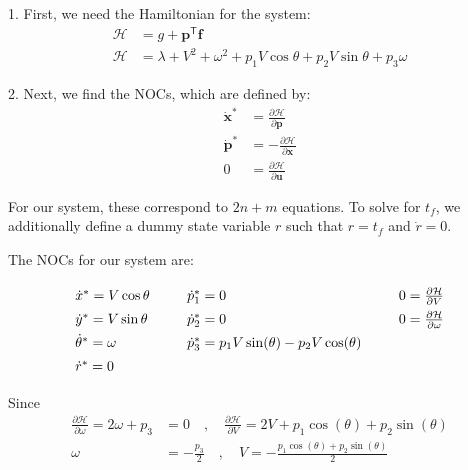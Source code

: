 \documentclass{article}
\begin{document}
\begin{enumerate}[label=(\roman*)]
	1. First, we need the Hamiltonian for the system:
	\begin{equation}
	\begin{aligned}
	\mathcal{H} &= g + \bm p^\mathsf{T} \bm f \\
	\mathcal{H} &= \lambda + V^2 + \omega^2 +
	               p_1 V\cos\theta + p_2 V\sin\theta + p_3 \omega
	\end{aligned}
	\end{equation}
	
	2. Next, we find the NOCs, which are defined by:
	\begin{equation}
	\begin{aligned}
	\dot{\bm{x}}^* &= \frac{\partial \mathcal{H}}{\partial \bm{p}} \\
	\dot{\bm{p}}^* &= -\frac{\partial \mathcal{H}}{\partial \bm{x}} \\
	0 &= \frac{\partial \mathcal{H}}{\partial \bm{u}}
	\end{aligned}
	\end{equation}
	
	For our system, these correspond to $2n+m$ equations. To solve for $t_f$, we additionally define a dummy state variable $r$ such that $r=t_f$ and $\dot r=0$.
	
	The NOCs for our system are:
	
	\begin{equation}
	{\renewcommand{\arraystretch}{1.4}
	\begin{tabular}[c]{l l l l l}
	$\dot x^* = V \cos\theta$ &\;&
	$\dot p_1^* = 0$	&\;&
	$0 = \frac{\partial\mathcal{H}}{\partial V}$ \\
	
	$\dot y^* = V \sin\theta$ &\;&
	$\dot p_2^* = 0$	&\;&
	$0 = \frac{\partial\mathcal{H}}{\partial \omega}$ \\
	
	$\dot \theta^* = \omega$ &\;&
	$\dot p_3^* = p_1V\sin(\theta) - p_2V\cos(\theta)$ \\
	
	$\dot r^* = 0$
	\end{tabular}}
	\end{equation}
	
	Since
	\begin{equation}
	\begin{aligned}
	\frac{\partial\mathcal{H}}{\partial \omega} = 2\omega + p_3 &= 0 \quad,\quad \frac{\partial\mathcal{H}}{\partial V} = 2V + p_1\cos(\theta) + p_2\sin(\theta) \\
	\omega &=-\frac{p_3}{2} \quad,\quad V = -\frac{p_1\cos(\theta)+p_2\sin(\theta)}{2}
	\end{aligned}
	\end{equation}
	

\end{enumerate}
\end{document}
